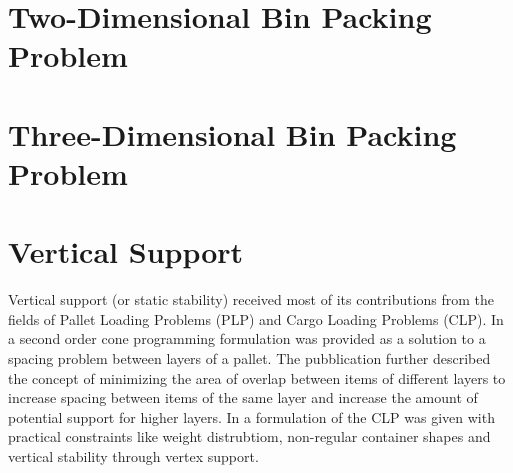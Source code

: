 \section{Two-Dimensional Bin Packing Problem}

\section{Three-Dimensional Bin Packing Problem}

\section{Vertical Support}
Vertical support (or static stability) received most of its contributions from the fields of Pallet Loading Problems (PLP) and Cargo Loading Problems (CLP). In \citep{elhedhli2019three} a second order cone programming formulation was provided as a solution to a spacing problem between layers of a pallet. The pubblication further described the concept of minimizing the area of overlap between items of different layers to increase spacing between items of the same layer and increase the amount of potential support for higher layers.
In \citep{paquay2016mixed} a formulation of the CLP was given with practical constraints like weight distrubtiom, non-regular container shapes and vertical stability through vertex support.